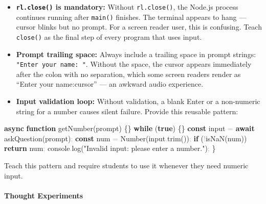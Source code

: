 \documentclass[
  justified,
  openright,
]{tufte-book}
\let\paragraph\paragraph
\newcommand{\KeywordTok}[1]{\textcolor{CodeKeyword}{\textbf{#1}}}  %
\newcommand{\StringTok}[1]{\textcolor{CodeString}{#1}}              %
\newcommand{\CodeFuncTok}[1]{\textcolor{CodeKeyword}{#1}}           %
\newcommand{\CodeAccentTok}[1]{\textcolor{CodeAccent}{#1}}          %
\newcommand{\OperatorTok}[1]{\textcolor{DarkGray}{#1}}              %
\newenvironment{Shaded}{%
  \begin{mdframed}[style=TufteCode]%
}{%
  \end{mdframed}%
}
\let\paragraph\paragraph
\begin{document}
\begin{itemize}
\item
  \textbf{\texttt{rl.close()} is mandatory:} Without
  \texttt{rl.close()}, the Node.js process continues running after
  \texttt{main()} finishes. The terminal appears to hang --- cursor
  blinks but no prompt. For a screen reader user, this is confusing.
  Teach \texttt{close()} as the final step of every program that uses
  input.
\item
  \textbf{Prompt trailing space:} Always include a trailing space in
  prompt strings: \texttt{"Enter\ your\ name:\ "}. Without the space,
  the cursor appears immediately after the colon with no separation,
  which some screen readers render as ``Enter your name:cursor'' --- an
  awkward audio experience.
\item
  \textbf{Input validation loop:} Without validation, a blank Enter or a
  non-numeric string for a number causes silent failure. Provide this
  reusable pattern:
\end{itemize}

\begin{Shaded}
\begin{Highlighting}[]
\KeywordTok{async} \KeywordTok{function} \CodeFuncTok{getNumber}(prompt) \{\}
  \KeywordTok{while} (\KeywordTok{true}) \{\}
    \KeywordTok{const} input \OperatorTok{=} \KeywordTok{await} \CodeFuncTok{askQuestion}(prompt)\OperatorTok{;}
    \KeywordTok{const} num \OperatorTok{=} Number(input\OperatorTok{.}\CodeFuncTok{trim}())\OperatorTok{;}
    \KeywordTok{if} (\OperatorTok{!}\CodeAccentTok{isNaN}(num)) \KeywordTok{return} num\OperatorTok{;}
    console\OperatorTok{.}\CodeFuncTok{log}(\StringTok{"Invalid input: please enter a number."})\OperatorTok{;}
  \}
\
\end{Highlighting}
\end{Shaded}

Teach this pattern and require students to use it whenever they need
numeric input.

\paragraph{Thought Experiments}\label{thought-experiments-20}
\end{document}
